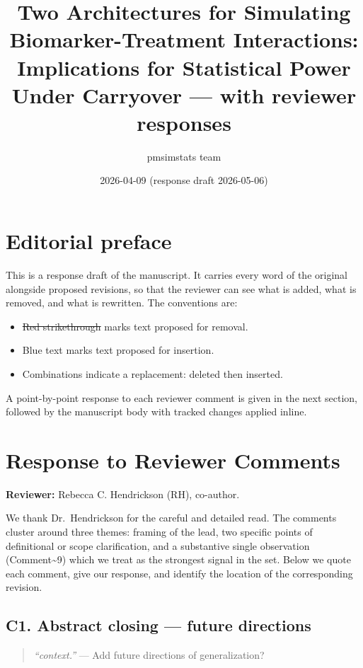 \documentclass[
]{article}
\title{Two Architectures for Simulating Biomarker-Treatment Interactions: Implications for Statistical Power Under Carryover --- with reviewer responses}
\author{pmsimstats team}
\date{2026-04-09 (response draft 2026-05-06)}
\begin{document}
\maketitle

{
\setcounter{tocdepth}{2}
\tableofcontents
}
\section*{Editorial preface}

This is a response draft of the manuscript. It carries every word of
the original alongside proposed revisions, so that the reviewer can
see what is added, what is removed, and what is rewritten. The
conventions are:

\begin{itemize}
  \item \textcolor{delred}{\sout{Red strikethrough}} marks text proposed for removal.
  \item \textcolor{addblue}{Blue text} marks text proposed for insertion.
  \item Combinations indicate a replacement: deleted then inserted.
\end{itemize}

A point-by-point response to each reviewer comment is given in the
next section, followed by the manuscript body with tracked changes
applied inline.

\clearpage

\section*{Response to Reviewer Comments}

\textbf{Reviewer:} Rebecca C. Hendrickson (RH), co-author.

We thank Dr.~Hendrickson for the careful and detailed read. The
comments cluster around three themes: framing of the lead, two
specific points of definitional or scope clarification, and a
substantive single observation (Comment\textasciitilde9) which we treat as the
strongest signal in the set. Below we quote each comment, give our
response, and identify the location of the corresponding revision.

\subsection*{C1. Abstract closing --- future directions}

\begin{quote}
\textit{``context.''} --- Add future directions of generalization?
\end{quote}
\end{document}
